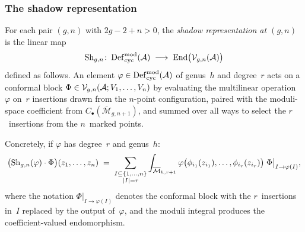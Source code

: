 \subsubsection{The shadow representation}

\begin{definition}
\label{def:thqg-VI-shadow-representation}
For each pair $(g,n)$ with $2g - 2 + n > 0$, the
\emph{shadow representation at $(g,n)$} is the linear map
\begin{equation}\label{eq:thqg-VI-shadow-representation}
\operatorname{Sh}_{g,n} \colon
\operatorname{Def}_{\mathrm{cyc}}^{\mathrm{mod}}(\mathcal{A})
\;\longrightarrow\;
\operatorname{End}\bigl(\mathcal{V}_{g,n}(\mathcal{A})\bigr)
\end{equation}
defined as follows. An element
$\varphi \in \operatorname{Def}_{\mathrm{cyc}}^{\mathrm{mod}}(\mathcal{A})$
of genus~$h$ and degree~$r$ acts on a conformal block
$\Phi \in \mathcal{V}_{g,n}(\mathcal{A}; V_1, \dotsc, V_n)$ by evaluating the
multilinear operation $\varphi$ on~$r$ insertions drawn from the
$n$-point configuration, paired with the moduli-space coefficient
from $C_\bullet(\overline{\mathcal{M}}_{g,n+1})$, and summed over
all ways to select the $r$~insertions from the $n$~marked points.

Concretely, if $\varphi$ has degree~$r$ and genus~$h$:
\begin{equation}\label{eq:thqg-VI-shadow-action-concrete}
\bigl(\operatorname{Sh}_{g,n}(\varphi) \cdot \Phi\bigr)(z_1,\dotsc,z_n)
\;=\;
\sum_{\substack{I \subseteq \{1,\dotsc,n\} \\ |I| = r}}
\int_{\overline{\mathcal{M}}_{h,r+1}}
\varphi\bigl(\phi_{i_1}(z_{i_1}),\dotsc,\phi_{i_r}(z_{i_r})\bigr)
\;\Phi\bigl|_{I \to \varphi(I)},
\end{equation}
where the notation $\Phi|_{I \to \varphi(I)}$ denotes the conformal
block with the $r$~insertions in~$I$ replaced by the output
of~$\varphi$, and the moduli integral produces the coefficient-valued
endomorphism.
\end{definition}

